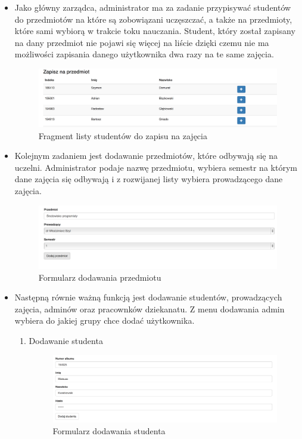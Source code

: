 \documentclass[brudnopis]{xmgr}
\begin{document}
\begin{itemize}
\item Jako główny zarządca, administrator ma za zadanie przypisywać studentów do przedmiotów na które są zobowiązani uczęszczać, a także na przedmioty, które sami wybiorą w trakcie toku nauczania. Student, który został zapisany na dany przedmiot nie pojawi się więcej na liście dzięki czemu nie ma możliwości zapisania danego użytkownika dwa razy na te same zajęcia.

\begin{figure}[th!]
\centering
\includegraphics[width=1.1\hsize]{images/addStudent} 
\caption{Fragment listy studentów do zapisu na zajęcia\label{RYS.5}}
\end{figure}

\item Kolejnym zadaniem jest dodawanie przedmiotów, które odbywają się na uczelni. Administrator podaje nazwę przedmiotu, wybiera semestr na którym dane zajęcia się odbywają i z rozwijanej listy wybiera prowadzącego dane zajęcia.

\begin{figure}[th!]
\centering
\includegraphics[width=1.1\hsize]{images/addSubject} 
\caption{Formularz dodawania przedmiotu\label{RYS.6}}
\end{figure}

\item Następną równie ważną funkcją jest dodawanie studentów, prowadzących zajęcia, adminów oraz pracownków dziekanatu. Z menu dodawania admin wybiera do jakiej grupy chce dodać użytkownika.

\begin{enumerate}
\item Dodawanie studenta

\begin{figure}[th!]
\centering
\includegraphics[width=1.1\hsize]{images/addNewStudent} 
\caption{Formularz dodawania studenta\label{RYS.7}}
\end{figure}


\end{enumerate}
\end{itemize}
\end{document}
